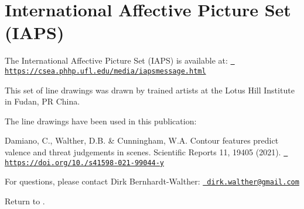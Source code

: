 \chapter{International Affective Picture Set (IAPS)}
\hypertarget{md_data_sets_2_i_a_p_s_2_i_a_p_s___readme}{}\label{md_data_sets_2_i_a_p_s_2_i_a_p_s___readme}
\label{md_data_sets_2_i_a_p_s_2_i_a_p_s___readme_autotoc_md1}%
%
 The International Affective Picture Set (IAPS) is available at\+: \href{https://csea.phhp.ufl.edu/media/iapsmessage.html}{\texttt{ https\+://csea.\+phhp.\+ufl.\+edu/media/iapsmessage.\+html}}

This set of line drawings was drawn by trained artists at the Lotus Hill Institute in Fudan, PR China.

The line drawings have been used in this publication\+:

Damiano, C., Walther, D.\+B. \& Cunningham, W.\+A. Contour features predict valence and threat judgements in scenes. Scientific Reports 11, 19405 (2021). \href{https://doi.org/10.1038/s41598-021-99044-y}{\texttt{ https\+://doi.\+org/10./s41598-\/021-\/99044-\/y}}

For questions, please contact Dirk Bernhardt-\/\+Walther\+: \href{mailto:dirk.walther@gmail.com}{\texttt{ dirk.\+walther@gmail.\+com}}

Return to . 